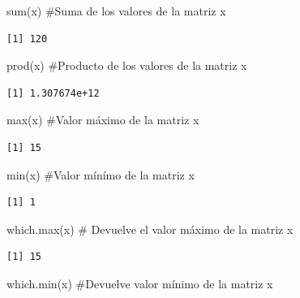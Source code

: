 \documentclass[
  letterpaper,
  DIV=11,
  numbers=noendperiod]{scrreprt}
\newenvironment{Shaded}{\begin{snugshade}}{\end{snugshade}}
\newcommand{\CommentTok}[1]{\textcolor[rgb]{0.37,0.37,0.37}{#1}}
\newcommand{\FunctionTok}[1]{\textcolor[rgb]{0.28,0.35,0.67}{#1}}
\newcommand{\NormalTok}[1]{\textcolor[rgb]{0.00,0.23,0.31}{#1}}
\begin{document}
\begin{Shaded}
\begin{Highlighting}[]
\FunctionTok{sum}\NormalTok{(x) }\CommentTok{\#Suma de los valores de la matriz x}
\end{Highlighting}
\end{Shaded}

\begin{verbatim}
[1] 120
\end{verbatim}

\begin{Shaded}
\begin{Highlighting}[]
\FunctionTok{prod}\NormalTok{(x) }\CommentTok{\#Producto de los valores de la matriz x}
\end{Highlighting}
\end{Shaded}

\begin{verbatim}
[1] 1.307674e+12
\end{verbatim}

\begin{Shaded}
\begin{Highlighting}[]
\FunctionTok{max}\NormalTok{(x) }\CommentTok{\#Valor máximo de la matriz x}
\end{Highlighting}
\end{Shaded}

\begin{verbatim}
[1] 15
\end{verbatim}

\begin{Shaded}
\begin{Highlighting}[]
\FunctionTok{min}\NormalTok{(x) }\CommentTok{\#Valor mínímo de la matriz x}
\end{Highlighting}
\end{Shaded}

\begin{verbatim}
[1] 1
\end{verbatim}

\begin{Shaded}
\begin{Highlighting}[]
\FunctionTok{which.max}\NormalTok{(x) }\CommentTok{\# Devuelve el valor máximo de la matriz x}
\end{Highlighting}
\end{Shaded}

\begin{verbatim}
[1] 15
\end{verbatim}

\begin{Shaded}
\begin{Highlighting}[]
\FunctionTok{which.min}\NormalTok{(x) }\CommentTok{\#Devuelve valor mínimo de la matriz x}
\end{Highlighting}
\end{Shaded}
\end{document}

